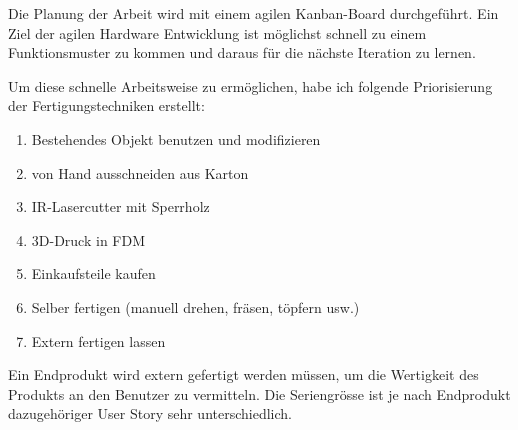 

Die Planung der Arbeit wird mit einem agilen Kanban-Board durchgeführt. Ein Ziel der agilen Hardware Entwicklung ist möglichst schnell zu einem Funktionsmuster zu kommen und daraus für die nächste Iteration zu lernen.

Um diese schnelle Arbeitsweise zu ermöglichen, habe ich folgende Priorisierung der Fertigungstechniken erstellt:

\begin{enumerate}
\item Bestehendes Objekt benutzen und modifizieren
\item von Hand ausschneiden aus Karton
\item IR-Lasercutter mit Sperrholz
\item 3D-Druck in FDM
\item Einkaufsteile kaufen
\item Selber fertigen (manuell drehen, fräsen, töpfern usw.)
\item Extern fertigen lassen
\end{enumerate}

Ein Endprodukt wird extern gefertigt werden müssen, um die Wertigkeit des Produkts an den Benutzer zu vermitteln. Die Seriengrösse ist je nach Endprodukt dazugehöriger User Story sehr unterschiedlich.
